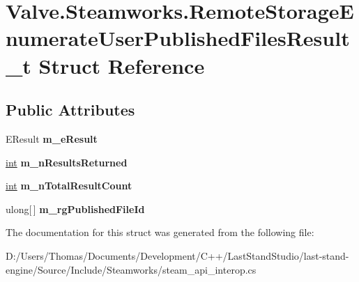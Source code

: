 \hypertarget{structValve_1_1Steamworks_1_1RemoteStorageEnumerateUserPublishedFilesResult__t}{}\section{Valve.\+Steamworks.\+Remote\+Storage\+Enumerate\+User\+Published\+Files\+Result\+\_\+t Struct Reference}
\label{structValve_1_1Steamworks_1_1RemoteStorageEnumerateUserPublishedFilesResult__t}
\subsection*{Public Attributes}
\begin{DoxyCompactItemize}
\item 
\hypertarget{structValve_1_1Steamworks_1_1RemoteStorageEnumerateUserPublishedFilesResult__t_ab4ab9140853df23def2ee971dedcb9df}{}E\+Result {\bfseries m\+\_\+e\+Result}\label{structValve_1_1Steamworks_1_1RemoteStorageEnumerateUserPublishedFilesResult__t_ab4ab9140853df23def2ee971dedcb9df}

\item 
\hypertarget{structValve_1_1Steamworks_1_1RemoteStorageEnumerateUserPublishedFilesResult__t_ae13cc7f8002421d10aca37147d1ffd94}{}\hyperlink{SDL__thread_8h_a6a64f9be4433e4de6e2f2f548cf3c08e}{int} {\bfseries m\+\_\+n\+Results\+Returned}\label{structValve_1_1Steamworks_1_1RemoteStorageEnumerateUserPublishedFilesResult__t_ae13cc7f8002421d10aca37147d1ffd94}

\item 
\hypertarget{structValve_1_1Steamworks_1_1RemoteStorageEnumerateUserPublishedFilesResult__t_a17a52d401bf42e2911addf565922b278}{}\hyperlink{SDL__thread_8h_a6a64f9be4433e4de6e2f2f548cf3c08e}{int} {\bfseries m\+\_\+n\+Total\+Result\+Count}\label{structValve_1_1Steamworks_1_1RemoteStorageEnumerateUserPublishedFilesResult__t_a17a52d401bf42e2911addf565922b278}

\item 
\hypertarget{structValve_1_1Steamworks_1_1RemoteStorageEnumerateUserPublishedFilesResult__t_a4738dae38aa758de1db272c9e27badd1}{}ulong\mbox{[}$\,$\mbox{]} {\bfseries m\+\_\+rg\+Published\+File\+Id}\label{structValve_1_1Steamworks_1_1RemoteStorageEnumerateUserPublishedFilesResult__t_a4738dae38aa758de1db272c9e27badd1}

\end{DoxyCompactItemize}


The documentation for this struct was generated from the following file\+:\begin{DoxyCompactItemize}
\item 
D\+:/\+Users/\+Thomas/\+Documents/\+Development/\+C++/\+Last\+Stand\+Studio/last-\/stand-\/engine/\+Source/\+Include/\+Steamworks/steam\+\_\+api\+\_\+interop.\+cs\end{DoxyCompactItemize}

